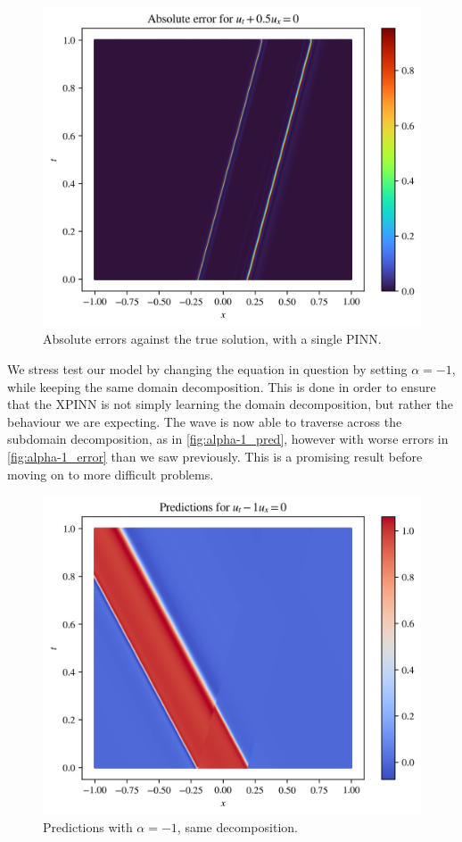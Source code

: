 \begin{figure}[h]
    \centering
    \includegraphics[width=0.8\linewidth]{Project1XPINNs/figures/advection/single_0.5_error.png}
    \caption{Absolute errors against the true solution, with a single PINN.}
    \label{fig:single_ad_error}
\end{figure}

We stress test our model by changing the equation in question by setting $\alpha=-1$, while keeping the same domain decomposition.
This is done in order to ensure that the XPINN is not simply learning the domain decomposition, but rather the behaviour we are expecting.
The wave is now able to traverse across the subdomain decomposition, as in \autoref{fig:alpha-1_pred}, however with worse errors in \autoref{fig:alpha-1_error} than we saw previously.
This is a promising result before moving on to more difficult problems.

\begin{figure}[h!]
    \centering
    \includegraphics[width=0.8\linewidth]{Project1XPINNs/figures/advection/-1_predictions.png}
    \caption{Predictions with $\alpha=-1$, same decomposition.}
    \label{fig:alpha-1_pred}
\end{figure}

